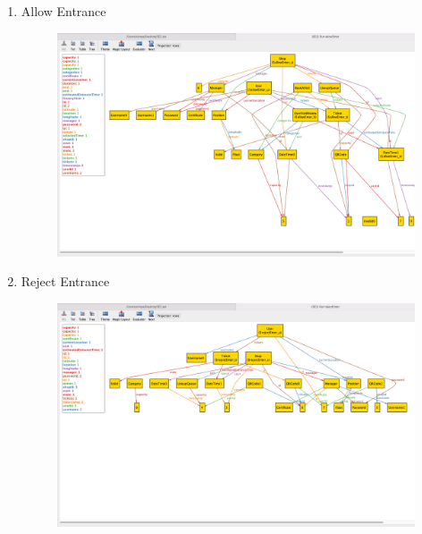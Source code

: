 \begin{enumerate}
	\item Allow Entrance \\
	\begin{figure}[H]
		\centering
		\includegraphics[width=0.9\textheight,keepaspectratio, angle=90]{images/alloy_AllowEnter.png}
	\end{figure}
	\clearpage

	\item Reject Entrance \\
	\begin{figure}[H]
		\centering
		\includegraphics[width=0.9\textheight,keepaspectratio, angle=90]{images/alloy_rejectEnter.png}
	\end{figure}
	\clearpage


\end{enumerate}
